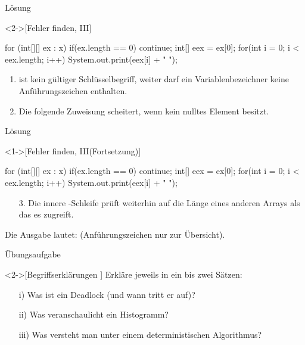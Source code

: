 \begin{frame}[c,fragile]{Lösung}
    \begin{solve}<2->[Fehler finden, III]
        \pause{}\begin{plainjava}
for (int[][] ex : x) {
    if(ex.length == 0) continue;
    int[] eex = ex[0];
    for(int i = 0; i < eex.length; i++)
        System.out.print(eex[i] + " ");
}
        \end{plainjava}
    \begin{enumerate}[<+(1)->]
        \item {} ist kein gültiger Schlüsselbegriff, weiter darf ein Variablen\-be\-zei\-chner keine Anführungszeichen enthalten.
        \item Die folgende Zuweisung scheitert, wenn  kein nulltes Element besitzt.
    \end{enumerate}
    \end{solve}
\end{frame}

\begin{frame}[c,fragile]{Lösung}
    \addtocounter{solve}{-1}
    \begin{solve}<1->[Fehler finden, III\hfill(Fortsetzung)]
        \begin{plainjava}
for (int[][] ex : x) {
    if(ex.length == 0) continue;
    int[] eex = ex[0];
    for(int i = 0; i < eex.length; i++)
        System.out.print(eex[i] + " ");
}
        \end{plainjava}
    \begin{enumerate}[<+(1)->]
        \item[3.] Die innere -Schleife prüft weiterhin auf die Länge eines anderen Arrays als das es zugreift.
    \end{enumerate}
    \pause{}Die Ausgabe lautet:\pause{}  (Anführungszeichen nur zur Übersicht).
    \end{solve}
\end{frame}


\begin{frame}[c]{Übungsaufgabe}
    \begin{exercise}<2->[Begriffserklärungen ]
        \pause{}Erkläre jeweils in ein bis zwei Sätzen: \begin{enumerate}[<+(1)->]
            \item[i)] Was ist ein Deadlock (und wann tritt er auf)?
            \item[ii)] Was veranschaulicht ein Histogramm?
            \item[iii)] Was versteht man unter einem deterministischen Algorithmus?
        \end{enumerate}
    \end{exercise}
\end{frame}


